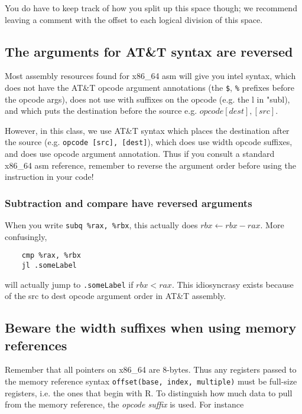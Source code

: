 \documentclass[11pt]{article}
\begin{document}
You do have to keep track of how you split up this space though; we recommend leaving a
comment with the offset to each logical division of this space.

\subsection{The arguments for AT\&T syntax are reversed}

Most assembly resources found for x86\_64 asm will give you intel syntax, which does not
have the AT\&T opcode argument annotations (the \texttt{\$}, \texttt{\%} prefixes before the
opcode args), does not use with suffixes on the opcode (e.g. the l in "subl),
and which puts the destination before the source e.g. $opcode [dest], [src]$.

However, in this class, we use AT\&T syntax which places the destination after the source
(e.g. \texttt{opcode [src], [dest]}), which does use width opcode suffixes, and does use opcode
argument annotation. Thus if you consult a standard x86\_64 asm reference, remember to
reverse the argument order before using the instruction in your code!

\subsubsection{Subtraction and compare have reversed arguments}

When you write \texttt{subq \%rax, \%rbx}, this actually does $rbx \leftarrow rbx - rax$. More
confusingly,

\begin{lstlisting}
    cmp %rax, %rbx
    jl .someLabel
\end{lstlisting}

will actually jump to \texttt{.someLabel} if $rbx < rax$. This idiosyncrasy exists because
of the src to dest opcode argument order in AT\&T assembly.

\subsection{Beware the width suffixes when using memory references}

Remember that all pointers on x86\_64 are 8-bytes. Thus any registers passed to the memory
reference syntax \texttt{offset(base, index, multiple)} must be full-size registers, i.e.
the ones that begin with R. To distinguish how much data to pull from the memory
reference, the \emph{opcode suffix} is used. For instance
\end{document}
